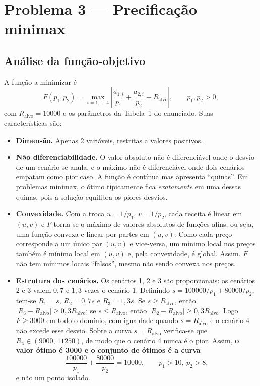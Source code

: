 \documentclass[12pt,a4paper]{article}
\begin{document}
\section{Problema 3 --- Precificação minimax}

\subsection{Análise da função-objetivo}

A função a minimizar é
\begin{equation}
F(p_1,p_2) = \max_{i=1,\dots,4} \left|\frac{a_{1,i}}{p_1}+\frac{a_{2,i}}{p_2} - R_{\mathrm{alvo}}\right|, \qquad p_1,p_2>0,
\end{equation}
com $R_{\mathrm{alvo}}=10000$ e os parâmetros da Tabela~1 do enunciado. Suas características são:

\begin{itemize}
  \item \textbf{Dimensão.} Apenas 2 variáveis, restritas a valores positivos.
  \item \textbf{Não diferenciabilidade.} O valor absoluto não é diferenciável onde o desvio de um cenário se anula, e o máximo não é diferenciável onde dois cenários empatam como pior caso. A função é contínua mas apresenta ``quinas''. Em problemas minimax, o ótimo tipicamente fica \emph{exatamente} em uma dessas quinas, pois a solução equilibra os piores desvios.
  \item \textbf{Convexidade.} Com a troca $u=1/p_1$, $v=1/p_2$, cada receita é linear em $(u,v)$ e $F$ torna-se o máximo de valores absolutos de funções afins, ou seja, uma função convexa e linear por partes em $(u,v)$. Como cada preço corresponde a um único par $(u,v)$ e vice-versa, um mínimo local nos preços também é mínimo local em $(u,v)$ e, pela convexidade, é global. Assim, $F$ não tem mínimos locais ``falsos'', mesmo não sendo convexa nos preços.
  \item \textbf{Estrutura dos cenários.} Os cenários 1, 2 e 3 são proporcionais: os cenários 2 e 3 valem $0{,}7$ e $1{,}3$ vezes o cenário 1. Definindo $s = 100000/p_1 + 80000/p_2$, tem-se $R_1=s$, $R_2=0{,}7s$ e $R_3=1{,}3s$. Se $s\ge R_{\mathrm{alvo}}$, então $|R_3-R_{\mathrm{alvo}}|\ge 0{,}3R_{\mathrm{alvo}}$; se $s\le R_{\mathrm{alvo}}$, então $|R_2-R_{\mathrm{alvo}}|\ge 0{,}3R_{\mathrm{alvo}}$. Logo $F\ge 3000$ em todo o domínio, com igualdade quando $s=R_{\mathrm{alvo}}$ e o cenário 4 não excede esse desvio. Sobre a curva $s=R_{\mathrm{alvo}}$ verifica-se que $R_4\in(9000,\,11250)$, de modo que o cenário 4 nunca é o pior. Assim, \textbf{o valor ótimo é 3000 e o conjunto de ótimos é a curva}
  \begin{equation}
  \frac{100000}{p_1}+\frac{80000}{p_2} = 10000, \qquad p_1>10,\ p_2>8,
  \end{equation}
  e não um ponto isolado.
\end{itemize}
\end{document}

